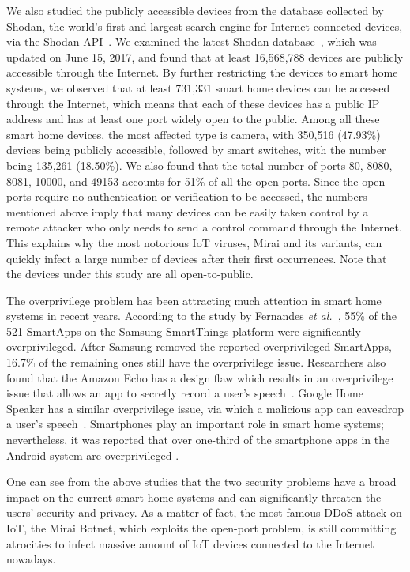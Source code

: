 \documentclass[letterpaper,12pt]{article}
\begin{document}
We also studied the publicly accessible devices from the database collected by Shodan, the world's first and largest search engine for Internet-connected devices, via the Shodan API~\cite{matherly2009shodan}. We examined the latest Shodan database~\cite{shodannews}, which was updated on June 15, 2017, and found that at least 16,568,788 devices are publicly accessible through the Internet. By further restricting the devices to smart home systems, we observed that at least 731,331 smart home devices can be accessed through the Internet, which means that each of these devices has a public IP address and has at least one port widely open to the public. Among all these smart home devices, the most affected type is camera, with 350,516 (47.93\%) devices being publicly accessible, followed by smart switches, with the number being 135,261 (18.50\%). We also found that the total number of ports 80, 8080, 8081, 10000, and 49153 accounts for 51\% of all the open ports. Since the open ports require no authentication or verification to be accessed, the numbers mentioned above imply that many devices can be easily taken control by a remote attacker who only needs to send a control command through the Internet. This explains why the most notorious IoT viruses, Mirai and its variants, can quickly infect a large number of devices after their first occurrences. Note that the devices under this study are all open-to-public.

The overprivilege problem has been attracting much attention in smart home systems in recent years. According to the study by Fernandes \emph{et al.}~\cite{fernandes2016security}, 55\% of the 521 SmartApps on the Samsung SmartThings platform were significantly overprivileged. After Samsung removed the reported overprivileged SmartApps, 16.7\% of the remaining ones still have the overprivilege issue.  Researchers also found that the Amazon Echo has a design flaw which results in an overprivilege issue that allows an app to secretly record a user's speech~\cite{amazonoverprivilege}. Google Home Speaker has a similar overprivilege issue, via which a malicious app can eavesdrop a user's speech~\cite{googleoverprivilege}. Smartphones play an important role in smart home systems; nevertheless, it was reported that over one-third of the smartphone apps in the Android system are overprivileged \cite{felt2011android}. 

One can see from the above studies that the two security problems have a broad impact on the current smart home systems and can significantly threaten the users' security and privacy. As a matter of fact, the most famous DDoS attack on IoT, the Mirai Botnet, which exploits the open-port problem, is still committing atrocities to infect massive amount of IoT devices connected to the Internet nowadays.
\end{document}
